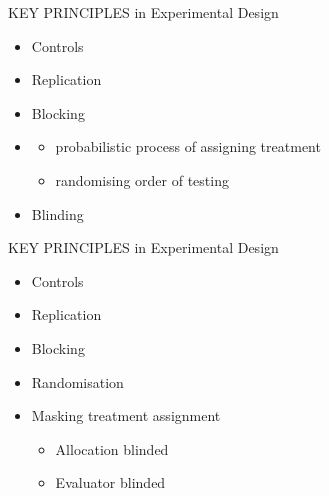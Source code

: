 \documentclass{beamer}
\begin{document}
\begin{frame}{KEY PRINCIPLES in Experimental Design}

\begin{alertblock}{}
 \begin{itemize}
  \item Controls
  \item Replication
  \item Blocking
  \item {\color{red}{Randomisation}}
    \begin{itemize}
     \item probabilistic process of assigning treatment
     \item randomising order of testing
    \end{itemize}
  \item Blinding
 \end{itemize}

\end{alertblock}

\end{frame}


\begin{frame}{KEY PRINCIPLES in Experimental Design}

\begin{alertblock}{}
 \begin{itemize}
  \item Controls
  \item Replication
  \item Blocking
  \item Randomisation
  \item {\color{red}{Blinding}} Masking treatment assignment
    \begin{itemize}
     \item Allocation blinded
     \item Evaluator blinded
    \end{itemize}
 \end{itemize}

\end{alertblock}

\end{frame}
\end{document}
